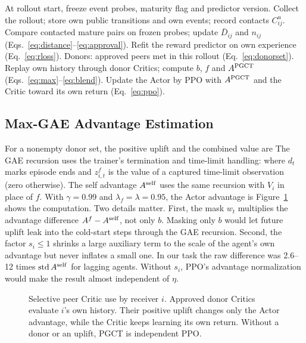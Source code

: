 \documentclass{article}
\begin{document}
\begin{algorithm}[tb]
\caption{One PGCT update of agent $i$}
\label{alg:pgct}
\begin{algorithmic}[1]
\STATE At rollout start, freeze event probes, maturity flag and predictor version.
\STATE Collect the rollout; store own public transitions and own events; record contacts $C^u_{ij}$.
\STATE Compare contacted mature pairs on frozen probes; update $\bar D_{ij}$ and $n_{ij}$ (Eqs.~\ref{eq:distance}--\ref{eq:approval}).
\STATE Refit the reward predictor on own experience (Eq.~\ref{eq:rloss}).
\ENDIF
\STATE Donors: approved peers met in this rollout (Eq.~\ref{eq:donorset}).
\STATE Replay own history through donor Critics; compute $b$, $f$ and $A^{\rm PGCT}$ (Eqs.~\ref{eq:max}--\ref{eq:blend}).
\STATE Update the Actor by PPO with $A^{\rm PGCT}$ and the Critic toward its own return (Eq.~\ref{eq:ppo}).
\end{algorithmic}
\end{algorithm}

\subsection{Max-GAE Advantage Estimation}
For a nonempty donor set, the positive uplift and the combined value are
\MaxEquation
The GAE recursion uses the trainer's termination and time-limit handling:
\GAEEquation
where $d_t$ marks episode ends and $z^f_{i,t}$ is the value of a captured time-limit observation (zero otherwise). The self advantage $A^{\rm self}$ uses the same recursion with $V_i$ in place of $f$. With $\gamma=0.99$ and $\lambda_f=\lambda=0.95$, the Actor advantage is
\BlendEquation
Figure~\ref{fig:critic} shows the computation. Two details matter. First, the mask $w_t$ multiplies the advantage difference $A^f-A^{\rm self}$, not only $b$. Masking only $b$ would let future uplift leak into the cold-start steps through the GAE recursion. Second, the factor $s_i\le1$ shrinks a large auxiliary term to the scale of the agent's own advantage but never inflates a small one. In our task the raw difference was 2.6--12 times $\operatorname{std}A^{\rm self}$ for lagging agents. Without $s_i$, PPO's advantage normalization would make the result almost independent of $\eta$.

\begin{figure}[t]
\centering\resizebox{.97\textwidth}{!}{}
\caption{Selective peer Critic use by receiver $i$. Approved donor Critics evaluate $i$'s own history. Their positive uplift changes only the Actor advantage, while the Critic keeps learning its own return. Without a donor or an uplift, PGCT is independent PPO.}\label{fig:critic}
\end{figure}
\end{document}

